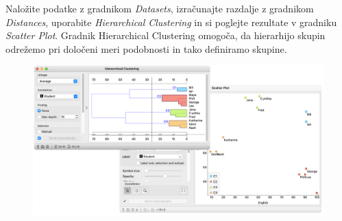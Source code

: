 Naložite podatke z gradnikom \textit{Datasets}, izračunajte razdalje z gradnikom \textit{Distances}, uporabite \textit{Hierarchical Clustering} in si poglejte rezultate v gradniku \textit{Scatter Plot}. Gradnik Hierarchical Clustering omogoča, da hierarhijo skupin odrežemo pri določeni meri podobnosti in tako definiramo skupine.

\begin{figure}[h]
    \includegraphics[width=\linewidth]{hc-scatter-plot.png}%
    \caption{ }
    \label{fig:010-hc-scatter-plot}
\end{figure}